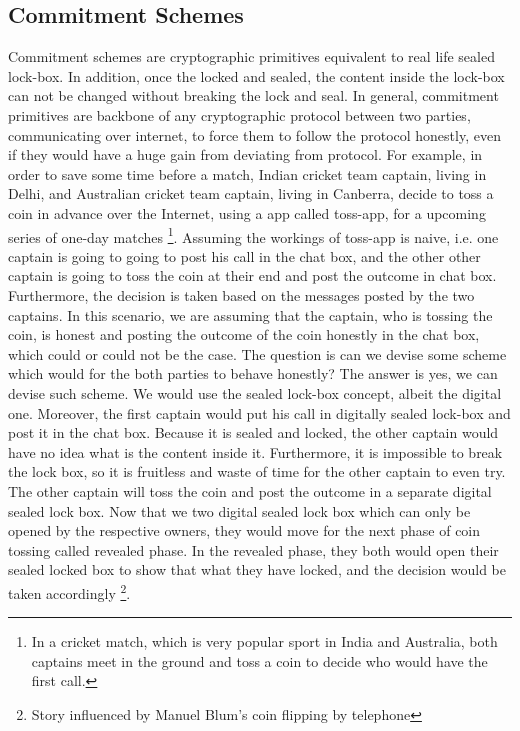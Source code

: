 {{     \subsection{Commitment Schemes}   
      Commitment schemes are cryptographic primitives equivalent to real life sealed lock-box. In addition, 
      once the locked and sealed, the content inside the lock-box can not be changed without breaking the lock and seal. 
      In general, commitment primitives 
      are backbone of any cryptographic protocol between two parties, communicating over internet, to force them  to  follow the 
      protocol honestly, even if they would have a huge gain from deviating 
      from protocol. For example, in order to save some time before a match, Indian cricket team captain, living in Delhi, and Australian cricket 
      team captain, living in Canberra, decide 
      to toss a coin in advance over the Internet, using a app called toss-app, for a  upcoming series of one-day matches
      \footnote{
      In a cricket match, which is very popular sport in India and Australia, both captains meet in the ground and toss a coin to 
      decide who would have the first call.}.  Assuming the workings of toss-app is naive, i.e. one captain is going to going to post
      his call in the chat box, and the other other captain is going to toss the coin at their end and post the outcome in chat box. 
      Furthermore, the decision is taken based on the messages posted by the two captains. In this scenario, we are assuming that 
      the captain, who is tossing the coin, is honest and posting the outcome of the coin honestly in the chat box, which could or 
      could not be the case.  The question is can we devise some scheme which would for the both parties to behave honestly? 
      The answer is yes, we can devise such scheme. We would use the sealed lock-box concept, albeit the digital one. Moreover, 
      the first captain would put his call in digitally sealed lock-box and post it in the chat box. Because it is sealed and 
      locked, the other captain would have no idea what is the content inside it. Furthermore, it is impossible to break 
      the lock box, so it is fruitless and waste of time for the other captain to even try. The other captain will toss the coin 
      and post the outcome in a separate digital sealed lock box. Now that we two digital sealed lock box which can 
      only be opened by the respective owners, they would move for the next phase of coin tossing  called revealed phase. 
      In the revealed phase, they both would open their sealed locked box to show that what they have locked, 
      and the decision would be taken accordingly \footnote{Story influenced by Manuel Blum's coin flipping by telephone}. 
      
}}
